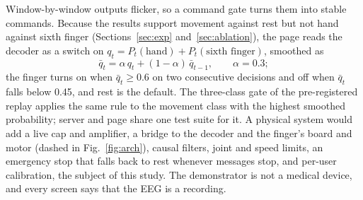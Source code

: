 Window-by-window outputs flicker, so a command gate turns them into stable commands. Because the
results support movement against rest but not hand against sixth finger
(Sections~\ref{sec:exp} and~\ref{sec:ablation}), the page reads the decoder as a switch on
$q_t = P_t(\text{hand}) + P_t(\text{sixth finger})$, smoothed as
\begin{equation}
\bar{q}_t = \alpha\, q_t + (1 - \alpha)\, \bar{q}_{t-1}, \qquad \alpha = 0.3;
\label{eq:gate}
\end{equation}
the finger turns on when $\bar{q}_t \geq 0.6$ on two consecutive decisions and off when
$\bar{q}_t$ falls below 0.45, and rest is the default. The three-class gate of the pre-registered
replay applies the same rule to the movement class with the highest smoothed probability; server
and page share one test suite for it. A physical system would add a live cap and amplifier, a
bridge to the decoder and the finger's board and motor (dashed in Fig.~\ref{fig:arch}), causal
filters, joint and speed limits, an emergency stop that falls back to rest whenever messages
stop, and per-user calibration, the subject of this study. The demonstrator is not a medical
device, and every screen says that the EEG is a recording.
